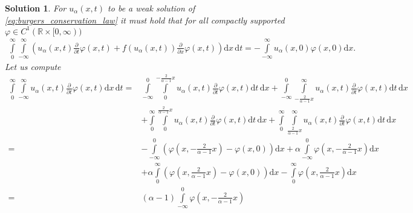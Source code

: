 \documentclass[10pt,letterpaper]{article}
\theoremstyle{break}
\newtheorem{solution}{Solution}
\begin{document}
\begin{solution}
    For $u_\alpha(x,t)$ to be a weak solution of
    \eqref{eq:burgers_conservation_law} it must hold that
    for all compactly supported $\varphi \in C^1(\mathbb{R} \times [0,\infty))$
    \begin{align}
    	\int\limits_{0}^{\infty}
    	\int\limits_{-\infty}^{\infty}
    	\left(
    		u_\alpha(x,t)
    		\frac{\partial}{\partial t} \varphi(x,t)
    		+
    		f(u_\alpha(x,t))
    		\frac{\partial}{\partial x} \varphi(x,t)
    	\right)
    	\text{d}x\, \text{d}t
    	=
    	-
    	\int\limits_{-\infty}^{\infty}
    	u_\alpha(x,0)
    	\varphi(x,0) 
    	\text{d}x.
    \end{align} 
    Let us compute
    \begin{equation}\label{eq:int_dt}
    \begin{aligned}
    	\int\limits_{0}^{\infty}
    	\int\limits_{-\infty}^{\infty}
    	u_\alpha(x,t)
    	\frac{\partial}{\partial t} \varphi(x,t)
    	\text{d}x\, \text{d}t
    	=
    	&
    	\int\limits_{-\infty}^{0}
    	\int\limits_{0}^{-\frac{2}{\alpha-1}x}
    	u_\alpha(x,t)
    	\frac{\partial}{\partial t} \varphi(x,t)
    	\text{d}t\, \text{d}x
    	+
    	\int\limits_{-\infty}^{0}
    	\int\limits_{-\frac{2}{\alpha-1}x}^{\infty}
    	u_\alpha(x,t)
    	\frac{\partial}{\partial t} \varphi(x,t)
    	\text{d}t\, \text{d}x \\
    	&
    	+
    	\int\limits_{0}^{\infty}
    	\int\limits_{0}^{\frac{2}{\alpha-1}x}
    	u_\alpha(x,t)
    	\frac{\partial}{\partial t} \varphi(x,t)
    	\text{d}t\, \text{d}x
    	+
    	\int\limits_{0}^{\infty}
    	\int\limits_{\frac{2}{\alpha-1}x}^{\infty}
    	u_\alpha(x,t)
    	\frac{\partial}{\partial t} \varphi(x,t)
    	\text{d}t\, \text{d}x \\
    	=
    	&
    	-
    	\int\limits_{-\infty}^{0}
    	\left(
    		\varphi
    		\left(x,-\frac{2}{\alpha-1}x\right)
    		-
    		\varphi(x,0)
    	\right)
    	\text{d}x
    	+
    	\alpha
    	\int\limits_{-\infty}^{0}
    	\varphi
    	\left(x,-\frac{2}{\alpha-1}x\right)
    	\text{d}x \\
    	&
    	+
    	\alpha
    	\int\limits_{0}^{\infty}
    	\left(
    		\varphi
    		\left(x,\frac{2}{\alpha-1}x\right)
    		-
    		\varphi(x,0)
    	\right)
    	\text{d}x
    	-
    	\int\limits_{0}^{\infty}
    	\varphi
    	\left(x,\frac{2}{\alpha-1}x\right) 
    	\text{d}x \\
    	=
    	&
    	(\alpha-1)
    	\int\limits_{-\infty}^{0}
    	\varphi
    	\left(x,-\frac{2}{\alpha-1}x\right)

\end{aligned}
\end{equation}
\end{solution}
\end{document}

